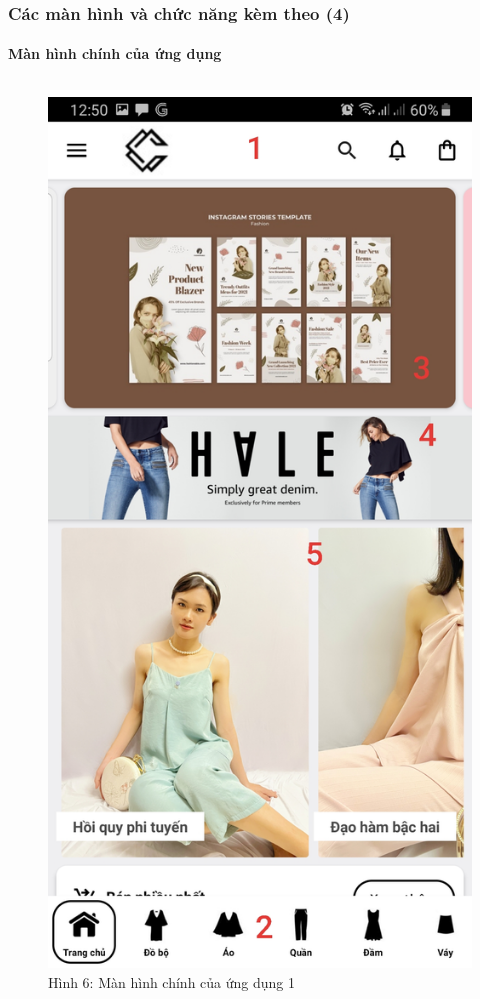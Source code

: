 \documentclass{beamer}
\begin{document}
\begin{frame}
    \frametitle{Các màn hình và chức năng kèm theo (4)}
    \framesubtitle{Màn hình chính của ứng dụng}

    \begin{columns}
        \begin{figure}
            \centering
            \includegraphics[height=0.7\textheight]{images/06.png}
            \caption{\centering\tiny{Hình 6: Màn hình chính của ứng dụng 1}}


\end{figure}
\end{columns}
\end{frame}
\end{document}
